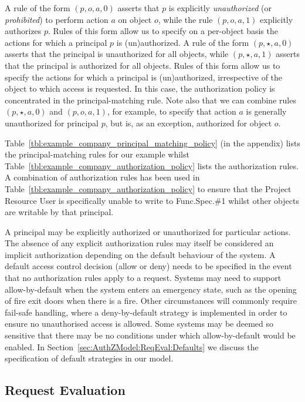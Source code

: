 \documentclass{article}
\begin{document}
A rule of the form $(p,o,a,0)$ asserts that $p$ is explicitly \emph{unauthorized} (or \emph{prohibited}) to perform action $a$ on object $o$, while the rule $(p,o,a,1)$ explicitly authorizes $p$.
Rules of this form allow us to specify on a per-object basis the actions for which a principal $p$ is (un)authorized.
A rule of the form $(p,\star,a,0)$ asserts that the principal is unauthorized for all objects, while $(p,\star,a,1)$ asserts that the principal is authorized for all objects.
Rules of this form allow us to specify the actions for which a principal is (un)authorized, irrespective of the object to which access is requested.
In this case, the authorization policy is concentrated in the principal-matching rule.
Note also that we can combine rules $(p,\star,a,0)$ and $(p,o,a,1)$, for example, to specify that action $a$ is generally unauthorized for principal $p$, but is, as an exception, authorized for object $o$.

Table~\ref{tbl:example_company_principal_matching_policy} (in the appendix) lists the principal-matching rules for our example whilst Table~\ref{tbl:example_company_authorization_policy} lists the authorization rules. A combination of authorization rules has been used in Table~\ref{tbl:example_company_authorization_policy} to ensure that the \textsf{Project Resource User} is specifically unable to write to \textsf{Func.Spec.\#1} whilst other objects are writable by that principal.

A principal may be explicitly authorized or unauthorized for particular actions.
The absence of any explicit authorization rules may itself be considered an implicit authorization depending on the default behaviour of the system.
A default access control decision (allow or deny) needs to be specified in the event that no authorization rules apply to a request.
Systems may need to support \textsf{allow-by-default} when the system enters an emergency state, such as the opening of fire exit doors when there is a fire.
Other circumstances will commonly require fail-safe handling, where a \textsf{deny-by-default} strategy is implemented in order to ensure no unauthorised access is allowed. Some systems may be deemed so sensitive that there may be no conditions under which \textsf{allow-by-default} would be enabled.
In Section~\ref{sec:AuthZModel:ReqEval:Defaults} we discuss the specification of default strategies in our model.

\subsection{Request Evaluation}\label{sec:AuthZModel:ReqEval}
\end{document}
